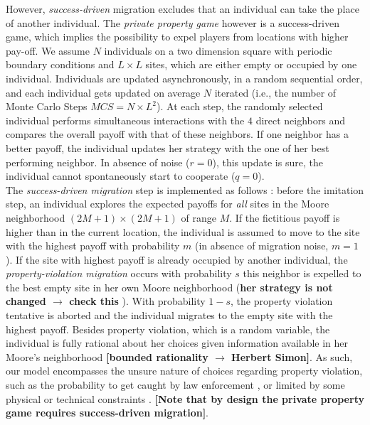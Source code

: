 However, {\it success-driven} migration excludes that an individual can take the place of another individual. The {\it private property game} however is a success-driven game, which implies the possibility to expel players from locations with higher pay-off. We assume $N$ individuals on a two dimension square with periodic boundary conditions and $L\times L$ sites, which are either empty or occupied by one individual. Individuals are updated asynchronously, in a random sequential order, and each individual gets updated on average $N$ iterated (i.e., the number of Monte Carlo Steps $MCS = N \times L^2$). At each step, the randomly selected individual performs simultaneous interactions with the $4$ direct neighbors and compares the overall payoff with that of these neighbors. If one neighbor has a better payoff, the individual updates her strategy with the one of her best performing neighbor. In absence of noise ($r=0$), this update is sure, the individual cannot spontaneously start to cooperate ($q=0$).\\

The {\it success-driven migration} step is implemented as follows \cite{helbing2009outbreak}: before the imitation step, an individual explores the expected payoffs for {\it all} sites in the Moore neighborhood $(2M + 1) \times (2M + 1)$ of range $M$. If the fictitious payoff is higher than in the current location, the individual is assumed to move to the site with the highest payoff with probability $m$ (in absence of migration noise, $m=1$). If the site with highest payoff is already occupied by another individual, the {\it property-violation migration} occurs with probability $s$ this neighbor is expelled to the best empty site in her own Moore neighborhood ({\bf her strategy is not changed $\rightarrow$ check this} ). With probability $1-s$, the property violation tentative is aborted and the individual migrates to the empty site with the highest payoff. Besides property violation, which is a random variable, the individual is fully rational about her choices given information available in her Moore's neighborhood {\bf [bounded rationality $\rightarrow$ Herbert Simon]}. As such, our model encompasses the unsure nature of choices regarding property violation, such as the probability to get caught by law enforcement \cite{}, or limited by some physical \cite{} or technical constraints \cite{}. {\bf [Note that by design the private property game requires success-driven migration]}.\\






